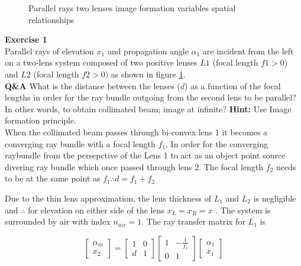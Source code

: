 \documentclass[main.tex]{subfiles}
\begin{document}
\begin{figure}
\centering{}
\caption{Parallel rays two lenses image formation variables spatial relationships}
\label{fig:2_1}
\end{figure}

\textbf{Exercise 1}\\
Parallel rays of elevation $x_1$ and propagation angle $\alpha_1$ are incident from the left on a two-lens system composed of two positive lenses $L1$ (focal length $f1>0$) and $L2$ (focal length $f2 >0)$ as shown in figure \ref{fig:2_1}.\\

\textbf{Q\&A} What is the distance between the lenses ($d$) as a function of the focal lengths in order for the ray bundle outgoing from the second lens to be parallel? In other words, to obtain collimated beam; image at infinite? \textbf{Hint:} Use Image formation principle.\\

When the collimated beam passes through bi-convex lens 1 it becomes a converging ray bundle with a focal length $f_1$. In order for the converging raybundle from the persepctive of the Lens 1 to act as an object point source divering ray bundle which once passed through lens 2. The focal length $f_2$ needs to be at the same point as $f_1 \therefore d = f_1 + f_2$\\ 

\iffalse

Due to the thin lens approximation, the lens thickness of $L_1$ and $L_2$ is negligible and $\therefore$ for elevation on either side of the lens $x_L = x_R = x$ . The system is surrounded by air with index $n_{air} = 1$. The ray transfer matrix for $L_1$ is


\begin{equation}
\begin{bmatrix}
    \alpha_m \\
    x_2
\end{bmatrix}
=
\begin{bmatrix}
    1   &   0 \\
    d   &   1
\end{bmatrix}
\begin{bmatrix}
    1   & -\frac{1}{f_1} \\
    0   &   1
\end{bmatrix}
\begin{bmatrix}
     \alpha_{1} \\
    x_1
\end{bmatrix}
\end{equation}
\end{document}
